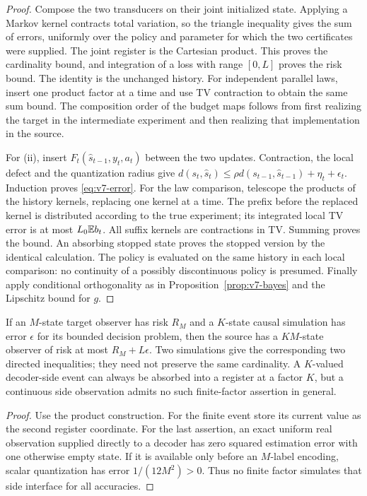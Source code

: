 \begin{proof}
Compose the two transducers on their joint initialized state. Applying a
Markov kernel contracts total variation, so the triangle inequality gives
the sum of errors, uniformly over the policy and parameter for which
the two certificates were supplied. The joint register is the Cartesian
product. This proves the cardinality bound, and integration of a loss
with range $[0,L]$ proves the risk bound. The identity is the unchanged history. For independent parallel laws,
insert one product factor at a time and use TV contraction to obtain
the same sum bound. The composition order of the
budget maps follows from first realizing the target in the intermediate
experiment and then realizing that implementation in the source.

For (ii), insert $F_t(\widehat s_{t-1},y_t,a_t)$ between the two updates.
Contraction, the local defect and the quantization radius give
$d(s_t,\widehat s_t)\le\rho d(s_{t-1},\widehat s_{t-1})+
\eta_t+\epsilon_t$. Induction proves \eqref{eq:v7-error}.
For the law comparison, telescope the products of the history kernels,
replacing one kernel at a time. The prefix before the replaced kernel
is distributed according to the true experiment; its integrated local
TV error is at most $L_0\mathbb E b_t$. All suffix kernels are contractions in
TV. Summing proves the bound. An absorbing stopped state proves the
stopped version by the identical calculation. The policy is evaluated
on the same history in each local comparison: no continuity of a
possibly discontinuous policy is presumed. Finally apply conditional
orthogonality as in Proposition~\ref{prop:v7-bayes} and the Lipschitz
bound for $g$.
\end{proof}

\begin{corollary}
\label{cor:v7-resource-profile}
If an $M$-state target observer has risk $R_M$ and a $K$-state causal
simulation has error $\epsilon$ for its bounded decision problem, then
the source has a $KM$-state observer of risk at most $R_M+L\epsilon$.
Two simulations give the corresponding two directed inequalities; they
need not preserve the same cardinality. A $K$-valued decoder-side event
can always be absorbed into a register at a factor $K$, but a continuous
side observation admits no such finite-factor assertion in general.
\end{corollary}
\begin{proof}
Use the product construction. For the finite event store its current
value as the second register coordinate. For the last assertion, an
exact uniform real observation supplied directly to a decoder has zero
squared estimation error with one otherwise empty state. If it is
available only before an $M$-label encoding, scalar quantization has
error $1/(12M^2)>0$. Thus no finite factor simulates that side interface
for all accuracies.
\end{proof}

